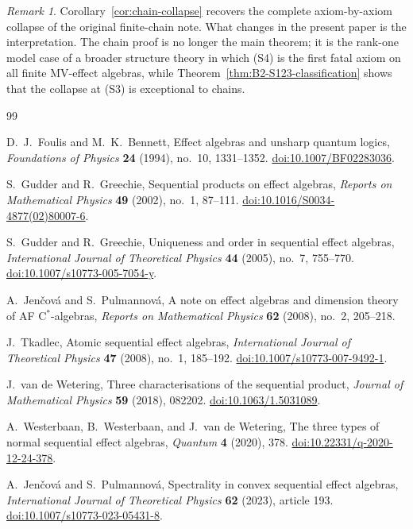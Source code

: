 \documentclass[11pt]{article}
\theoremstyle{definition}
\theoremstyle{remark}
\newtheorem{remark}[theorem]{Remark}
\numberwithin{equation}{section}
\newcommand{\doi}[1]{\href{https://doi.org/#1}{doi:#1}}
\begin{document}
\begin{remark}
Corollary~\ref{cor:chain-collapse} recovers the complete axiom-by-axiom collapse of the original finite-chain note. What changes in the present paper is the interpretation. The chain proof is no longer the main theorem; it is the rank-one model case of a broader structure theory in which \textup{(S4)} is the first fatal axiom on all finite MV-effect algebras, while Theorem~\ref{thm:B2-S123-classification} shows that the collapse at \textup{(S3)} is exceptional to chains.
\end{remark}

\begin{thebibliography}{99}

D.~J.~Foulis and M.~K.~Bennett,
\newblock Effect algebras and unsharp quantum logics,
\newblock \emph{Foundations of Physics} \textbf{24} (1994), no.~10, 1331--1352.
\newblock \doi{10.1007/BF02283036}.

S.~Gudder and R.~Greechie,
\newblock Sequential products on effect algebras,
\newblock \emph{Reports on Mathematical Physics} \textbf{49} (2002), no.~1, 87--111.
\newblock \doi{10.1016/S0034-4877(02)80007-6}.


S.~Gudder and R.~Greechie,
\newblock Uniqueness and order in sequential effect algebras,
\newblock \emph{International Journal of Theoretical Physics} \textbf{44} (2005), no.~7, 755--770.
\newblock \doi{10.1007/s10773-005-7054-y}.

A.~Jen\v{c}ov\'{a} and S.~Pulmannov\'{a},
\newblock A note on effect algebras and dimension theory of AF C$^*$-algebras,
\newblock \emph{Reports on Mathematical Physics} \textbf{62} (2008), no.~2, 205--218.

J.~Tkadlec,
\newblock Atomic sequential effect algebras,
\newblock \emph{International Journal of Theoretical Physics} \textbf{47} (2008), no.~1, 185--192.
\newblock \doi{10.1007/s10773-007-9492-1}.


J.~van de Wetering,
\newblock Three characterisations of the sequential product,
\newblock \emph{Journal of Mathematical Physics} \textbf{59} (2018), 082202.
\newblock \doi{10.1063/1.5031089}.

A.~Westerbaan, B.~Westerbaan, and J.~van de Wetering,
\newblock The three types of normal sequential effect algebras,
\newblock \emph{Quantum} \textbf{4} (2020), 378.
\newblock \doi{10.22331/q-2020-12-24-378}.

A.~Jen\v{c}ov\'{a} and S.~Pulmannov\'{a},
\newblock Spectrality in convex sequential effect algebras,
\newblock \emph{International Journal of Theoretical Physics} \textbf{62} (2023), article 193.
\newblock \doi{10.1007/s10773-023-05431-8}.

\end{thebibliography}
\end{document}
